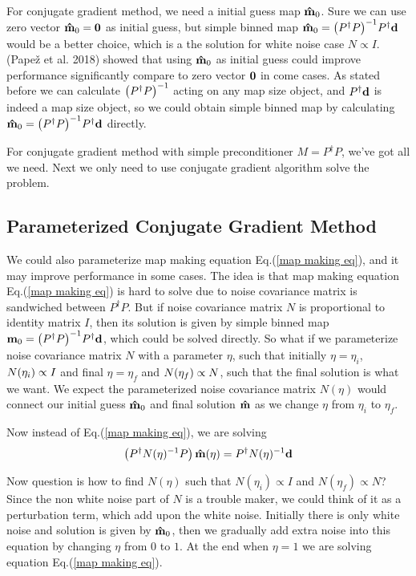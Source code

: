 \documentclass[11pt, letterpaper]{article}
\newcommand{\vbd}{\vb{d}}
\newcommand{\vbm}{\vb{m}}
\newcommand{\inv}[1]{#1^{-1}}
\newcommand{\hatm}{\vb{\hat{m}}}
\newcommand{\Pdagger}{P^{\dagger}}
\newcommand{\PPinv}[1]{\inv{\qty(\Pdagger #1 P)}}
\begin{document}
For conjugate gradient method, we need a initial guess map $\hatm_0$. 
Sure we can use zero vector $\hatm_0 = \vb{0}$ as initial guess,
but simple binned map $\hatm_0 = \PPinv{} \Pdagger \vbd$ would be a better 
choice, which is a the solution for white noise case $N \propto I$.
(Pape\v{z} et al. 2018\cite{2018A&A...620A..59P}) showed that using 
$\hatm_0$ as initial guess could improve performance significantly compare to
zero vector $\vb{0}$ in come cases.
As stated before we can calculate $\PPinv{}$ acting on any map size object,
and $\Pdagger \vbd$ is indeed a map size object, 
so we could obtain simple binned map by calculating
$\hatm_0 = \PPinv{} \Pdagger \vbd$ directly.

For conjugate gradient method with simple preconditioner $M = \Pdagger P$,
we've got all we need.
Next we only need to use conjugate gradient algorithm solve the problem.

\subsection{Parameterized Conjugate Gradient Method}

We could also parameterize map making equation Eq.(\ref{map making eq}),
and it may improve performance in some cases.
The idea is that map making equation Eq.(\ref{map making eq}) is hard to solve
due to noise covariance matrix is sandwiched between $\Pdagger P$.
But if noise covariance matrix $N$ is proportional to identity matrix $I$, 
then its solution is given by simple binned map
$\vbm_0 = \inv{\qty(\Pdagger P)} \Pdagger \vbd$,
which could be solved directly. 
So what if we parameterize noise covariance matrix $N$ with a parameter $\eta$,
such that initially $\eta = \eta_i$, $N\qty(\eta_i) \propto I$ 
and final $\eta = \eta_f$ and $N\qty(\eta_f) \propto N$,
such that the final solution is what we want.
We expect the parameterized noise covariance matrix $N(\eta)$
would connect our initial guess $\hatm_0$ and final solution $\hatm$ as we 
change $\eta$ from $\eta_i$ to $\eta_f$.

Now instead of Eq.(\ref{map making eq}), we are solving
\begin{align}
\qty(\Pdagger \inv{N(\eta)} P)\, \hatm(\eta) 
= \Pdagger \inv{N(\eta)} \vbd \label{map making para}
\end{align}

Now question is how to find $N(\eta)$ such that $N(\eta_i) \propto I$
and $N (\eta_f) \propto N$?
Since the non white noise part of $N$ is a trouble maker,
we could think of it as a perturbation term, which add upon the white noise.
Initially there is only white noise and solution is given by $\hatm_0$,
then we gradually add extra noise into this equation by changing $\eta$ from 
$0$ to $1$.
At the end when $\eta=1$ we are solving equation Eq.(\ref{map making eq}).
\end{document}
